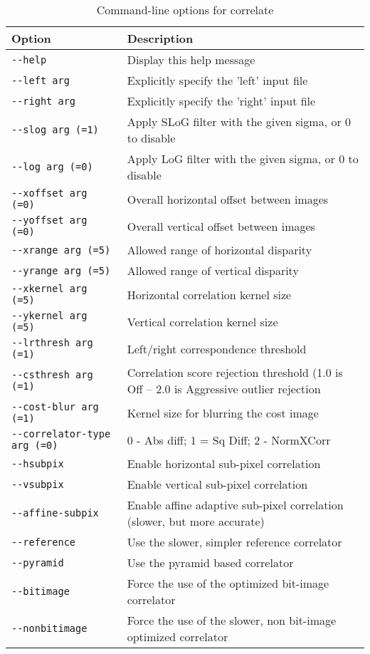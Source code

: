 \begin{longtable}{|l|p{10cm}|} 
\caption{Command-line options for correlate}
\label{tbl:correlate}
\endfirsthead
\endhead
\endfoot
\endlastfoot
\hline
Option & Description \\ \hline \hline
\verb#--help# & Display this help message \\ \hline
\verb#--left arg# & Explicitly specify the 'left' input file \\ \hline
\verb#--right arg# & Explicitly specify the 'right' input file \\ \hline
\verb#--slog arg (=1)# & Apply SLoG filter with the given sigma, or 0 to disable \\ \hline
\verb#--log arg (=0)# & Apply LoG filter with the given sigma, or 0 to disable \\ \hline
\verb#--xoffset arg (=0)# & Overall horizontal offset between images \\ \hline
\verb#--yoffset arg (=0)# & Overall vertical offset between images \\ \hline
\verb#--xrange arg (=5)# & Allowed range of horizontal disparity \\ \hline
\verb#--yrange arg (=5)# & Allowed range of vertical disparity \\ \hline
\verb#--xkernel arg (=5)# & Horizontal correlation kernel size \\ \hline
\verb#--ykernel arg (=5)# & Vertical correlation kernel size \\ \hline
\verb#--lrthresh arg (=1)# & Left/right correspondence threshold \\ \hline
\verb#--csthresh arg (=1)# & Correlation score rejection threshold (1.0 is Off -- 2.0 is Aggressive outlier rejection \\ \hline
\verb#--cost-blur arg (=1)# & Kernel size for blurring the cost image \\ \hline
\verb#--correlator-type arg (=0)# & 0 - Abs diff; 1 = Sq Diff; 2 - NormXCorr \\ \hline
\verb#--hsubpix# & Enable horizontal sub-pixel correlation \\ \hline
\verb#--vsubpix# & Enable vertical sub-pixel correlation \\ \hline
\verb#--affine-subpix# & Enable affine adaptive sub-pixel correlation (slower, but more accurate) \\ \hline
\verb#--reference# & Use the slower, simpler reference correlator \\ \hline
\verb#--pyramid# & Use the pyramid based correlator \\ \hline
\verb#--bitimage# & Force the use of the optimized bit-image correlator \\ \hline
\verb#--nonbitimage# & Force the use of the slower, non bit-image optimized correlator \\ \hline
\end{longtable}


